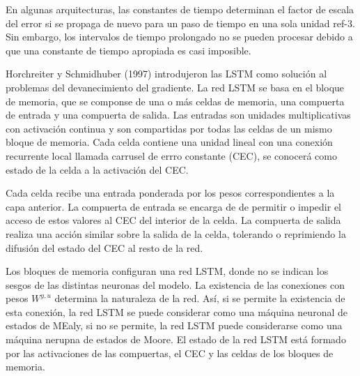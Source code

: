 En algunas arquitecturas, las constantes de tiempo determinan el factor de escala del error si se propaga de nuevo para un paso de tiempo en una sola unidad ref-3. Sin embargo, los intervalos de tiempo prolongado no se pueden procesar debido a que una constante de tiempo apropiada es casi imposible.



Horchreiter y Schmidhuber (1997) introdujeron las LSTM como solución al problemas del devanecimiento del gradiente. La red LSTM se basa en el bloque de memoria, que se componse de una o más celdas de memoria, una compuerta de entrada y una compuerta de salida. Las entradas son unidades multiplicativas con activación continua y son compartidas por todas las celdas de un mismo bloque de memoria. Cada celda contiene una unidad lineal con una conexión recurrente local llamada carrusel de errro constante (CEC), se conocerá como estado de la celda a la activación del CEC.

Cada celda recibe una entrada ponderada por los pesos correspondientes a la capa anterior. La compuerta de entrada se encarga de de permitir o impedir el acceso de estos valores al CEC del interior de la celda. La compuerta de salida realiza una acción similar sobre la salida de la celda, tolerando o reprimiendo la difusión del estado del CEC al resto de la red.

Los bloques de memoria configuran una red LSTM, donde no se indican los sesgos de las distintas neuronas del modelo. La existencia de las conexiones con pesos $W^{y, u}$  determina la naturaleza de la red. Así, si se permite la existencia de esta conexión, la red LSTM se puede considerar como una máquina neuronal de estados de MEaly, si no se permite, la red LSTM puede considerarse como una máquina nerupna de estados de Moore. El estado de la red LSTM está formado por las activaciones de las compuertas, el CEC y las celdas de los bloques de memoria.












